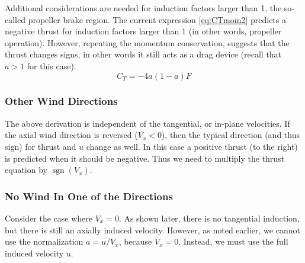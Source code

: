 \documentclass{article}
\DeclareMathOperator{\sgn}{sgn}
\begin{document}
Additional considerations are needed for induction factors larger than 1, the so-called propeller brake region.  The current expression \cref{eq:CTmom2} predicts a negative thrust for induction factors larger than 1 (in other words, propeller operation).  However, repeating the momentum conservation, suggests that the thrust changes signs, in other words it still acts as a drag device (recall that $a > 1$ for this case).
\begin{equation}
    C_T = - 4 a (1 - a) F
    \label{eq:CTpb}
\end{equation}



\subsubsection{Other Wind Directions}

The above derivation is independent of the tangential, or in-plane velocities.  If the axial wind direction is reversed ($V_x < 0$), then the typical direction (and thus sign) for thrust and $u$ change as well.  In this case a positive thrust (to the right) is predicted when it should be negative.  Thus we need to multiply the thrust equation by $\sgn(V_x)$.


\subsubsection{No Wind In One of the Directions}

Consider the case where $V_x = 0$.  As shown later, there is no tangential induction, but there is still an axially induced velocity.  However, as noted earlier, we cannot use the normalization $a = u/V_x$, because $V_x = 0$.  Instead, we must use the full induced velocity $u$.
\end{document}
